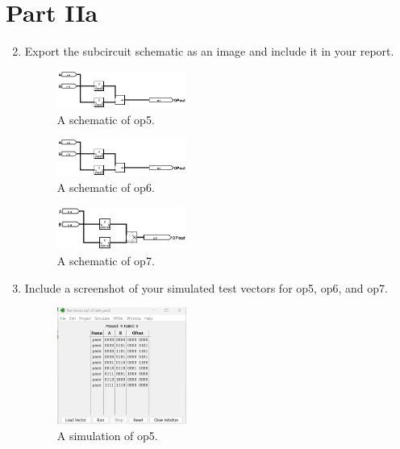 \documentclass{article}
\begin{document}
\section*{Part IIa}

\begin{enumerate}
\setcounter{enumi}{1}
\item Export the subcircuit schematic as an image and include it in your report.

\begin{figure}[ht!]
    \centering
    \includegraphics[width=0.4\textwidth]{lab4_op5.png}
    \caption{A schematic of op5.}
    \label{f:op5}
\end{figure}

\begin{figure}[ht!]
    \centering
    \includegraphics[width=0.4\textwidth]{lab4_op6.png}
    \caption{A schematic of op6.}
    \label{f:op6}
\end{figure}

\begin{figure}[ht!]
    \centering
    \includegraphics[width=0.4\textwidth]{lab4_op7.png}
    \caption{A schematic of op7.}
    \label{f:op7}
\end{figure}

\item Include a screenshot of your simulated test vectors for op5, op6, and op7.

\begin{figure}[ht!]
    \centering
    \includegraphics[width=0.4\textwidth]{lab4_op5_simulation.png}
    \caption{A simulation of op5.}
    \label{f:op5_simulation}
\end{figure}


\end{enumerate}
\end{document}
